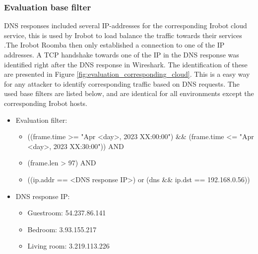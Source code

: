 \subsubsection{Evaluation base filter}
 DNS responses included several IP-addresses for the corresponding Irobot cloud service, this is used by Irobot to load balance the traffic towards their services \cite{dns_load_balancing}.The Irobot Roomba then only established a connection to one of the IP addresses. A TCP handshake towards one of the IP in the DNS response was identified right after the DNS response in Wireshark. The identification of these are presented in Figure \ref{fig:evaluation_corresponding_cloud}. This is a easy way for any attacker to identify corresponding traffic based on DNS requests. The used base filters are listed below, and are identical for all environments except the corresponding Irobot hosts. 

\begin{itemize}
    \item Evaluation filter: \begin{itemize}
                                \item ((frame.time >= "Apr <day>, 2023 XX:00:00") \&\& (frame.time <= "Apr <day>, 2023 XX:30:00")) AND
                                \item (frame.len > 97) AND 
                                \item  ((ip.addr == <DNS response IP>) or (dns \&\& ip.dst == 192.168.0.56))
                            \end{itemize}
    \item DNS response IP:  \begin{itemize}
                                \item Guestroom: 54.237.86.141 
                                \item Bedroom: 3.93.155.217 
                                \item Living room: 3.219.113.226 
                            \end{itemize}
\end{itemize}

